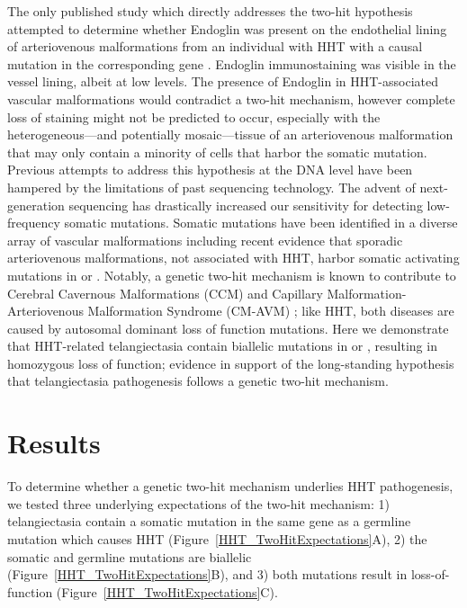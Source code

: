 The only published study which directly addresses the two-hit hypothesis attempted to determine whether Endoglin was present on the endothelial lining of arteriovenous malformations from an individual with HHT with a causal mutation in the corresponding gene  \citep{pece1999}. Endoglin immunostaining was visible in the vessel lining, albeit at low levels. The presence of Endoglin in HHT-associated vascular malformations would contradict a two-hit mechanism, however complete loss of staining might not be predicted to occur, especially with the heterogeneous---and potentially mosaic---tissue of an arteriovenous malformation that may only contain a minority of cells that harbor the somatic mutation. Previous attempts to address this hypothesis at the DNA level have been hampered by the limitations of past sequencing technology. The advent of next-generation sequencing has drastically increased our sensitivity for detecting low-frequency somatic mutations. Somatic mutations have been identified in a diverse array of vascular malformations \citep{alolabi2018, soblet2017, limaye2015, limaye2009, shirley2013, couto2015, luks2015} including recent evidence that sporadic arteriovenous malformations, not associated with HHT, harbor somatic activating mutations in  or  \citep{nikolaev2018, couto2017}. Notably, a genetic two-hit mechanism is known to contribute to Cerebral Cavernous Malformations (CCM) \citep{akers2009, mcdonald2014, gault2009} and Capillary Malformation-Arteriovenous Malformation Syndrome (CM-AVM) \citep{macmurdo2016}; like HHT, both diseases are caused by autosomal dominant loss of function mutations. Here we demonstrate that HHT-related telangiectasia contain biallelic mutations in  or , resulting in homozygous loss of function; evidence in support of the long-standing hypothesis that telangiectasia pathogenesis follows a genetic two-hit mechanism.


\section{Results}
To determine whether a genetic two-hit mechanism underlies HHT pathogenesis, we tested three underlying expectations of the two-hit mechanism: 1) telangiectasia contain a somatic mutation in the same gene as a germline mutation which causes HHT (Figure~\ref{HHT_TwoHitExpectations}A), 2) the somatic and germline mutations are biallelic (Figure~\ref{HHT_TwoHitExpectations}B), and 3) both mutations result in loss-of-function (Figure~\ref{HHT_TwoHitExpectations}C).

